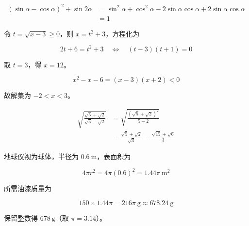 \begin{answer}
\nopagebreak[4]
\[
\begin{aligned}
(\sin\alpha-\cos\alpha)^2+\sin2\alpha
&=\sin^2\alpha+\cos^2\alpha-2\sin\alpha\cos\alpha
+2\sin\alpha\cos\alpha\\
&=1
\end{aligned}
\]


令 $t=\sqrt{x-3}\ge0$，则 $x=t^2+3$，方程化为

\nopagebreak[4]
\[
2t+6=t^2+3
\quad\Longleftrightarrow\quad
(t-3)(t+1)=0
\]

取 $t=3$，得 $x=12$。


\nopagebreak[4]
\[
x^2-x-6=(x-3)(x+2)<0
\]

故解集为 $-2<x<3$。


\nopagebreak[4]
\[
\begin{aligned}
\sqrt{\frac{\sqrt5+\sqrt2}{\sqrt5-\sqrt2}}
&=\sqrt{\frac{(\sqrt5+\sqrt2)^2}{5-2}}\\
&=\frac{\sqrt5+\sqrt2}{\sqrt3}
=\frac{\sqrt{15}+\sqrt6}{3}
\end{aligned}
\]


地球仪视为球体，半径为 $0.6\ \mathrm m$，表面积为

\nopagebreak[4]
\[
4\pi r^2=4\pi(0.6)^2=1.44\pi\ \mathrm{m^2}
\]

所需油漆质量为

\nopagebreak[4]
\[
150\times1.44\pi=216\pi\ \mathrm g
\approx678.24\ \mathrm g
\]

保留整数得 $678\ \mathrm g$（取 $\pi=3.14$）。







\end{answer}
